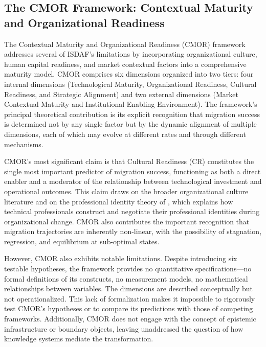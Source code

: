 \documentclass[12pt,a4paper]{article}
\begin{document}
\subsection{The CMOR Framework: Contextual Maturity and Organizational Readiness}

The Contextual Maturity and Organizational Readiness (CMOR) framework addresses several of ISDAF's limitations by incorporating organizational culture, human capital readiness, and market contextual factors into a comprehensive maturity model. CMOR comprises six dimensions organized into two tiers: four internal dimensions (Technological Maturity, Organizational Readiness, Cultural Readiness, and Strategic Alignment) and two external dimensions (Market Contextual Maturity and Institutional Enabling Environment). The framework's principal theoretical contribution is its explicit recognition that migration success is determined not by any single factor but by the dynamic alignment of multiple dimensions, each of which may evolve at different rates and through different mechanisms.

CMOR's most significant claim is that Cultural Readiness (CR) constitutes the single most important predictor of migration success, functioning as both a direct enabler and a moderator of the relationship between technological investment and operational outcomes. This claim draws on the broader organizational culture literature \citep{cameron2006diagnosing} and on the professional identity theory of \citet{pratt2006constructing}, which explains how technical professionals construct and negotiate their professional identities during organizational change. CMOR also contributes the important recognition that migration trajectories are inherently non-linear, with the possibility of stagnation, regression, and equilibrium at sub-optimal states.

However, CMOR also exhibits notable limitations. Despite introducing six testable hypotheses, the framework provides no quantitative specifications---no formal definitions of its constructs, no measurement models, no mathematical relationships between variables. The dimensions are described conceptually but not operationalized. This lack of formalization makes it impossible to rigorously test CMOR's hypotheses or to compare its predictions with those of competing frameworks. Additionally, CMOR does not engage with the concept of epistemic infrastructure or boundary objects, leaving unaddressed the question of how knowledge systems mediate the transformation.
\end{document}
